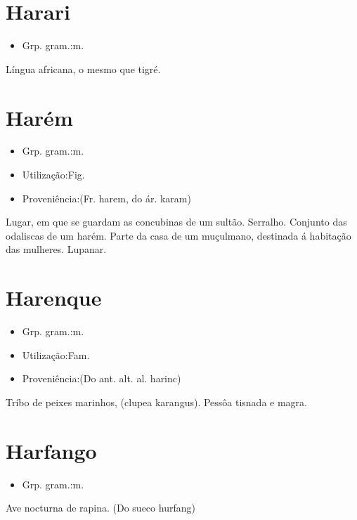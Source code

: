 \documentclass{article}
\begin{document}
\section{Harari}
\begin{itemize}
\item {Grp. gram.:m.}
\end{itemize}
Língua africana, o mesmo que \textunderscore tigré\textunderscore .
\section{Harém}
\begin{itemize}
\item {Grp. gram.:m.}
\end{itemize}
\begin{itemize}
\item {Utilização:Fig.}
\end{itemize}
\begin{itemize}
\item {Proveniência:(Fr. \textunderscore harem\textunderscore , do ár. \textunderscore karam\textunderscore )}
\end{itemize}
Lugar, em que se guardam as concubinas de um sultão.
Serralho.
Conjunto das odaliscas de um harém.
Parte da casa de um muçulmano, destinada á habitação das mulheres.
Lupanar.
\section{Harenque}
\begin{itemize}
\item {Grp. gram.:m.}
\end{itemize}
\begin{itemize}
\item {Utilização:Fam.}
\end{itemize}
\begin{itemize}
\item {Proveniência:(Do ant. alt. al. \textunderscore harinc\textunderscore )}
\end{itemize}
Tríbo de peixes marinhos, (\textunderscore clupea karangus\textunderscore ).
Pessôa tisnada e magra.
\section{Harfango}
\begin{itemize}
\item {Grp. gram.:m.}
\end{itemize}
Ave nocturna de rapina.
(Do sueco \textunderscore hurfang\textunderscore )
\end{document}
